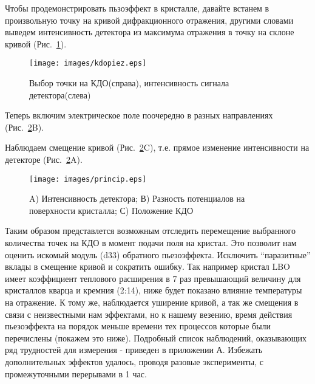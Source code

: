 Чтобы продемонстрировать пьзоэффект в кристалле, давайте встанем в произвольную точку
на кривой дифракционного отражения, другими словами выведем интенсивность детектора
из максимума отражения в точку на склоне кривой (Рис.~\ref{ris:kdopiez}).

\begin{figure}[H]
\centering
\texttt{[image: images/kdopiez.eps]}
\caption{Выбор точки на КДО(справа), интенсивность сигнала детектора(слева)}
\label{ris:kdopiez}
\end{figure}

\par
Теперь включим электрическое поле поочередно в разных направлениях (Рис.~\ref{ris:princip}B).
\par
Наблюдаем смещение кривой (Рис.~\ref{ris:princip}C), т.е.
 прямое изменение интенсивности на детекторе (Рис.~\ref{ris:princip}A).

\begin{figure}[H]
\centering
\texttt{[image: images/princip.eps]}
\caption{A) Интенсивность детектора; В) Разность потенциалов на
поверхности кристалла; С) Положение КДО}
\label{ris:princip}
\end{figure}

\textcolor{mygreen}{
Таким образом представлется возможным отследить перемещение выбранного количества
 точек на КДО в момент подачи поля на кристал. Это позволит нам оценить искомый
 модуль (d33) обратного пьезоэффекта. Исключить ``паразитные'' вклады в смещение кривой
  и сократить ошибку. Так например кристал LBO имеет коэффициент теплового расширения
   в 7 раз превышающий величину для кристаллов кварца и кремния (2:14), ниже будет
   показано влияние температуры на отражение. К тому же, наблюдается уширение кривой,
   а так же смещения в связи с неизвестными нам эффектами, но к нашему везению, время
   действия пьезоэффекта на порядок меньше времени тех процессов которые были перечислены
    (покажем это ниже). Подробный список наблюдений, оказывающих ряд трудностей для измерения -
    приведен в приложении А. Избежать дополнительных эффектов удалось, проводя разовые эксперименты,
    с промежуточными перерывами в 1 час.
}

